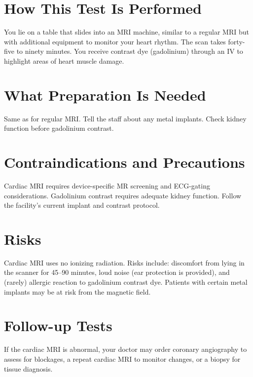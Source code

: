 \section*{How This Test Is Performed}
You lie on a table that slides into an MRI machine, similar to a regular MRI but with additional equipment to monitor your heart rhythm. The scan takes forty-five to ninety minutes. You receive contrast dye (gadolinium) through an IV to highlight areas of heart muscle damage.

\section*{What Preparation Is Needed}
Same as for regular MRI. Tell the staff about any metal implants. Check kidney function before gadolinium contrast.

\section*{Contraindications and Precautions}
Cardiac MRI requires device-specific MR screening and ECG-gating considerations. Gadolinium contrast requires adequate kidney function. Follow the facility's current implant and contrast protocol.

\section*{Risks}
Cardiac MRI uses no ionizing radiation. Risks include: discomfort from lying in the scanner for 45--90 minutes, loud noise (ear protection is provided), and (rarely) allergic reaction to gadolinium contrast dye. Patients with certain metal implants may be at risk from the magnetic field.

\section*{Follow-up Tests}
If the cardiac MRI is abnormal, your doctor may order coronary angiography to assess for blockages, a repeat cardiac MRI to monitor changes, or a biopsy for tissue diagnosis.
\clearpage
